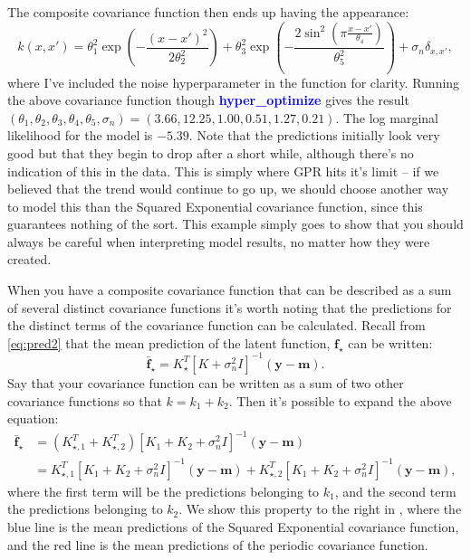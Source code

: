 \documentclass[a4paper,11pt,article,oneside]{memoir}
\newcommand{\func}[1]{\textbf{\textcolor{blue}{#1}}}
\begin{document}
The composite covariance function then ends up having the appearance:
\begin{equation}
k(x,x') = \theta_1^2 \exp\left( -\frac{(x-x')^2}{2\theta_2^2}\right) + \theta_3^2 \exp \left(- \frac{2\sin^2 \left( \pi \frac{x-x'}{\theta_4} \right)}{\theta_5^2} \right) + \sigma_n\delta_{x,x'}, \nonumber
\end{equation}
where I've included the noise hyperparameter in the function for clarity. Running the above covariance function though \func{hyper\_optimize} gives the result $(\theta_1,\theta_2,\theta_3,\theta_4,\theta_5,\sigma_n)=(3.66,12.25,1.00,0.51,1.27,0.21)$. The log marginal likelihood for the model is $-5.39$. Note that the predictions initially look very good but that they begin to drop after a short while, although there's no indication of this in the data. This is simply where GPR hits it's limit -- if we believed that the trend would continue to go up, we should choose another way to model this than the Squared Exponential covariance function, since this guarantees nothing of the sort. This example simply goes to show that you should always be careful when interpreting model results, no matter how they were created.

When you have a composite covariance function that can be described as a sum of several distinct covariance functions it's worth noting that the predictions for the distinct terms of the covariance function can be calculated. Recall from \eqref{eq:pred2} that the mean prediction of the latent function, $\mathbf{f}_\star$ can be written:
\begin{equation}
\bar{\mathbf{f}}_\star = K_\star^T\left[K + \sigma_n^2 I \right]^{-1}(\mathbf{y}-\mathbf{m}). \nonumber
\end{equation}
Say that your covariance function can be written as a sum of two other covariance functions so that $k = k_1 + k_2$. Then it's possible to expand the above equation:
\begin{align}
\bar{\mathbf{f}}_\star &= \left(K_{\star,1}^T + K_{\star,2}^T\right)\left[K_1 + K_2 + \sigma_n^2 I \right]^{-1}(\mathbf{y}-\mathbf{m}) \nonumber \\
 &= K_{\star,1}^T\left[K_1 + K_2 + \sigma_n^2 I \right]^{-1}(\mathbf{y}-\mathbf{m}) + K_{\star,2}^T\left[K_1 + K_2 + \sigma_n^2 I \right]^{-1}(\mathbf{y}-\mathbf{m}), \nonumber
\end{align}
%
where the first term will be the predictions belonging to $k_1$, and the second term the predictions belonging to $k_2$. We show this property to the right in , where the blue line is the mean predictions of the Squared Exponential covariance function, and the red line is the mean predictions of the periodic covariance function.
\end{document}
